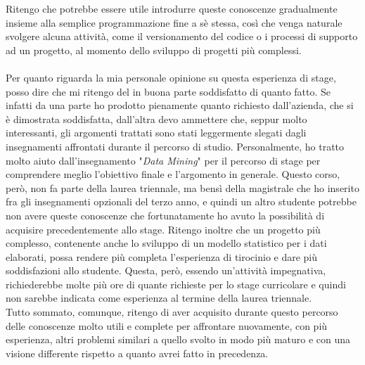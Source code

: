 Ritengo che potrebbe essere utile introdurre queste conoscenze gradualmente insieme alla semplice programmazione fine a sè stessa, così che venga naturale svolgere alcuna attività, come il versionamento del codice o i processi di supporto ad un progetto, al momento dello sviluppo di progetti più complessi. \\\\
\noindent Per quanto riguarda la mia personale opinione su questa esperienza di stage, posso dire che mi ritengo del in buona parte soddisfatto di quanto fatto. Se infatti da una parte ho prodotto pienamente quanto richiesto dall'azienda, che si è dimostrata soddisfatta, dall'altra devo ammettere che, seppur molto interessanti, gli argomenti trattati sono stati leggermente slegati dagli insegnamenti affrontati durante il percorso di studio. Personalmente, ho tratto molto aiuto dall'insegnamento "\textit{Data Mining}" per il percorso di stage per comprendere meglio l'obiettivo finale e l'argomento in generale. Questo corso, però, non fa parte della laurea triennale, ma bensì della magistrale che ho inserito fra gli insegnamenti opzionali del terzo anno, e quindi un altro studente potrebbe non avere queste conoscenze che fortunatamente ho avuto la possibilità di acquisire precedentemente allo stage. Ritengo inoltre che un progetto più complesso, contenente anche lo sviluppo di un modello statistico per i dati elaborati, possa rendere più completa l'esperienza di tirocinio e dare più soddisfazioni allo studente. Questa, però, essendo un'attività impegnativa, richiederebbe molte più ore di quante richieste per lo stage curricolare e quindi non sarebbe indicata come esperienza al termine della laurea triennale. \\
Tutto sommato, comunque, ritengo di aver acquisito durante questo percorso delle conoscenze molto utili e complete per affrontare nuovamente, con più esperienza, altri problemi similari a quello svolto in modo più maturo e con una visione differente rispetto a quanto avrei fatto in precedenza.